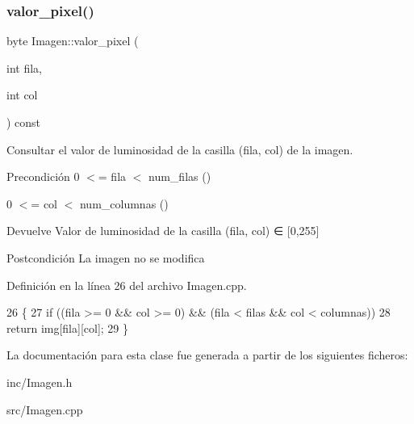 \subsubsection{\texorpdfstring{valor\+\_\+pixel()}{valor\_pixel()}}
{\footnotesize\ttfamily byte Imagen\+::valor\+\_\+pixel (\begin{DoxyParamCaption}\item[{int}]{fila,  }\item[{int}]{col }\end{DoxyParamCaption}) const}



Consultar el valor de luminosidad de la casilla (fila, col) de la imagen. 

\begin{DoxyPrecond}{Precondición}
0 $<$= fila $<$ num\+\_\+filas () 

0 $<$= col $<$ num\+\_\+columnas () 
\end{DoxyPrecond}
\begin{DoxyReturn}{Devuelve}
Valor de luminosidad de la casilla (fila, col) ∈ \mbox{[}0,255\mbox{]} 
\end{DoxyReturn}
\begin{DoxyPostcond}{Postcondición}
La imagen no se modifica 
\end{DoxyPostcond}


Definición en la línea 26 del archivo Imagen.\+cpp.


\begin{DoxyCode}
26                                                 \{
27   \textcolor{keywordflow}{if} ((fila >= 0 && col >= 0) && (fila < filas && col < columnas))
28     \textcolor{keywordflow}{return} img[fila][col];
29 \}
\end{DoxyCode}


La documentación para esta clase fue generada a partir de los siguientes ficheros\+:\begin{DoxyCompactItemize}
\item 
inc/Imagen.\+h\item 
src/Imagen.\+cpp\end{DoxyCompactItemize}
